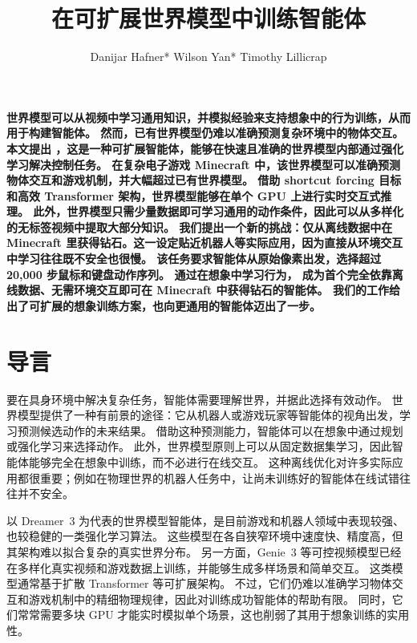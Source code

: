 \documentclass[11pt]{article}
\title{\vspace*{-1.7ex}在可扩展世界模型中训练智能体\vspace*{-.2ex}}
\date{}
\author{%
Danijar Hafner*\quad
Wilson Yan*\quad
Timothy Lillicrap
}
\begin{document}
\maketitle
\pagestyle{fancy}

\vspace*{-2ex}
{\ignorespaces\bfseries%
世界模型可以从视频中学习通用知识，并模拟经验来支持想象中的行为训练，从而用于构建智能体。
然而，已有世界模型仍难以准确预测复杂环境中的物体交互。
本文提出 \method{}，这是一种可扩展智能体，能够在快速且准确的世界模型内部通过强化学习解决控制任务。
在复杂电子游戏 Minecraft 中，该世界模型可以准确预测物体交互和游戏机制，并大幅超过已有世界模型。
借助 shortcut forcing 目标和高效 Transformer 架构，世界模型能够在单个 GPU 上进行实时交互式推理。
此外，世界模型只需少量数据即可学习通用的动作条件，因此可以从多样化的无标签视频中提取大部分知识。
我们提出一个新的挑战：仅从离线数据中在 Minecraft 里获得钻石。这一设定贴近机器人等实际应用，因为直接从环境交互中学习往往既不安全也很慢。
该任务要求智能体从原始像素出发，选择超过 20,000 步鼠标和键盘动作序列。
通过在想象中学习行为，\method{} 成为首个完全依靠离线数据、无需环境交互即可在 Minecraft 中获得钻石的智能体。
我们的工作给出了可扩展的想象训练方案，也向更通用的智能体迈出了一步。
}

\vfill
\vfill

\vfill
\clearpage

\section{导言}

要在具身环境中解决复杂任务，智能体需要理解世界，并据此选择有效动作。
世界模型提供了一种有前景的途径：它从机器人或游戏玩家等智能体的视角出发，学习预测候选动作的未来结果。
借助这种预测能力，智能体可以在想象中通过规划或强化学习来选择动作。
此外，世界模型原则上可以从固定数据集学习，因此智能体能够完全在想象中训练，而不必进行在线交互。
这种离线优化对许多实际应用都很重要；例如在物理世界的机器人任务中，让尚未训练好的智能体在线试错往往并不安全。

以 Dreamer~3 为代表的世界模型智能体，是目前游戏和机器人领域中表现较强、也较稳健的一类强化学习算法\citep{dreamerv3,wu2023daydreamer,hansen2023tdtmpc2,alonso2024diffusion,schrittwieser2019muzero,hessel2021muesli}。
这些模型在各自狭窄环境中速度快、精度高，但其架构难以拟合复杂的真实世界分布。
另一方面，Genie~3 等可控视频模型已经在多样化真实视频和游戏数据上训练，并能够生成多样场景和简单交互\citep{genie3,tu2025playerone,he2025matrix,sun2025virtual,bai2025whole,team2025yan}。
这类模型通常基于扩散 Transformer 等可扩展架构\citep{peebles2023dit,diffusionforcing}。
不过，它们仍难以准确学习物体交互和游戏机制中的精细物理规律，因此对训练成功智能体的帮助有限。
同时，它们常常需要多块 GPU 才能实时模拟单个场景，这也削弱了其用于想象训练的实用性。
\end{document}
